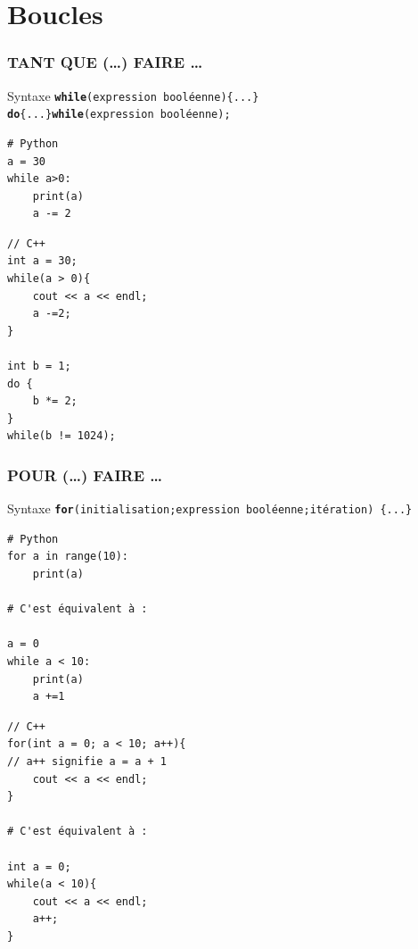 \section{Boucles}

\begin{frame}[fragile]
	\frametitle{TANT QUE (\dots) FAIRE \dots}

    \begin{block}{Syntaxe}
        \texttt{\textbf{while}(expression booléenne)\{...\}}\\
        \texttt{\textbf{do}\{...\}\textbf{while}(expression booléenne);}
    \end{block}

    \begin{minipage}{0.47\linewidth}
        \begin{verbatim}
# Python
a = 30
while a>0:
    print(a)
    a -= 2

        \end{verbatim}
    \end{minipage}
    \hfill
    \begin{minipage}{0.47\linewidth}
        \begin{verbatim}
// C++
int a = 30;
while(a > 0){
    cout << a << endl;
    a -=2;
}

int b = 1;
do {
    b *= 2;
}
while(b != 1024);

        \end{verbatim}
    \end{minipage}
\end{frame}

\begin{frame}[fragile]
	\frametitle{POUR (\dots) FAIRE \dots}
    \begin{block}{Syntaxe}
        \texttt{\textbf{for}(initialisation{\huge;}expression booléenne{\huge;}itération) \{...\}}\\
    \end{block}

    \begin{minipage}{0.37\linewidth}
        \begin{verbatim}
# Python
for a in range(10):
    print(a)

# C'est équivalent à :

a = 0
while a < 10:
    print(a)
    a +=1
        \end{verbatim}
    \end{minipage}
    \hfill
    \begin{minipage}{0.57\linewidth}
        \begin{verbatim}
// C++
for(int a = 0; a < 10; a++){
// a++ signifie a = a + 1
    cout << a << endl;
}

# C'est équivalent à :

int a = 0;
while(a < 10){
    cout << a << endl;
    a++;
}
        \end{verbatim}
    \end{minipage}
\end{frame}

